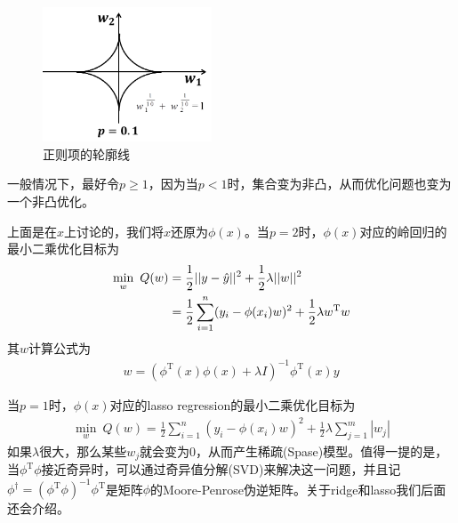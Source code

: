 \begin{figure}[H]
\begin{varwidth}[t]{\textwidth}
          \end{varwidth}
            \begin{varwidth}[t]{\textwidth}
            \vspace{0pt}
            \includegraphics[height=4cm]{images/The_contour_of_regular_term5.jpg}
          \end{varwidth}
        \caption{正则项的轮廓线}
        \label{fig:正则项的轮廓线}
        \end{figure}
        一般情况下，最好令$p \geqslant 1$，因为当$p <1$时，集合变为非凸，从而优化问题也变为一个非凸优化。
        \par
        上面是在$x$上讨论的，我们将$x$还原为$\phi(x)$。当$p=2$时，$\phi(x)$对应的岭回归的最小二乘优化目标为
        \begin{align}
        \label{ridge回归的一般形式}
        \min_w \ Q(w) &= \frac{1}{2}||y - \hat{y}||^2+\frac{1}{2}\lambda||w||^2\notag\\
        &=\frac{1}{2}\sum_{i=1}^n(y_i - \phi(x_i)w)^2 + \frac{1}{2}\lambda w^\mathrm{T}w
        \end{align}
        其$w$计算公式为
        \begin{align*}
        w = (\phi^\mathrm{T}(x)\phi(x)+\lambda I)^{-1} \phi^\mathrm{T}(x)y
        \end{align*}
        \par
        当$p = 1$时，$\phi(x)$对应的lasso regression的最小二乘优化目标为
        \begin{align}
        \label{lasso回归的一般形式}
        \min_w\ Q(w) = \frac{1}{2}\sum_{i=1}^n(y_i - \phi(x_i)w)^2+\frac{1}{2}\lambda\sum_{j=1}^m|w_j|
        \end{align}
        如果$\lambda$很大，那么某些$w_j$就会变为0，从而产生稀疏(Spase)模型。值得一提的是，当$\phi^\mathrm{T}\phi$接近奇异时，可以通过奇异值分解(SVD)来解决这一问题，并且记$\phi^{\dagger} = (\phi^\mathrm{T}\phi)^{-1}\phi^{\mathrm{T}}$是矩阵$\phi$的Moore-Penrose伪逆矩阵。关于ridge和lasso我们后面还会介绍。

